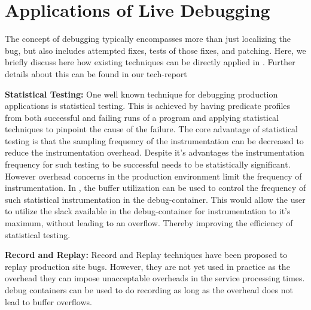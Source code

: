 \vspace{-2mm}
\section{Applications of Live Debugging}
\label{sec:application}
The concept of debugging typically encompasses more than just localizing the bug, but also includes attempted fixes, tests of those fixes, and patching. Here, we briefly discuss here how existing techniques can be directly applied in \parikshan. 
Further details about this can be found in our tech-report~\cite{parikshanTR}

\noindent
\textbf{Statistical Testing:}
One well known technique for debugging production applications is statistical testing. 
This is achieved by having predicate profiles from both successful and failing runs of a program and applying statistical techniques to pinpoint the cause of the failure.
The core advantage of statistical testing is that the sampling frequency of the instrumentation can be decreased to reduce the instrumentation overhead.
Despite it's advantages the instrumentation frequency for such testing to be successful needs to be statistically significant. 
However overhead concerns in the production environment limit the frequency of instrumentation.
In \parikshan, the buffer utilization can be used to control the frequency of such statistical instrumentation in the debug-container. 
This would allow the user to utilize the slack available in the debug-container for instrumentation to it's maximum, without leading to an overflow. 
Thereby improving the efficiency of statistical testing.

\noindent
\textbf{Record and Replay:}
Record and Replay techniques have been proposed to replay production site bugs. 
However, they are not yet used in practice as the overhead they can impose unacceptable overheads in the service processing times.
\parikshan debug containers can be used to do recording as long as the overhead does not lead to buffer overflows.


